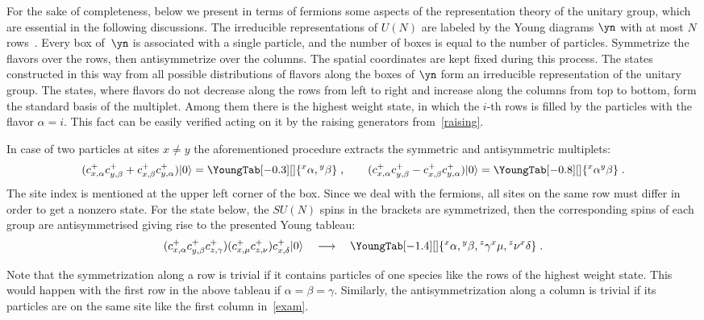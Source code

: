 For the sake of completeness,  below we present in terms of fermions  some aspects
of the representation theory  of the unitary group, which are essential in
the following discussions.
The irreducible representations of $U(N)$
are labeled by the Young diagrams $\yn$ with at most $N$ rows~\cite{Hamermesh}.
Every box of~$\yn$ is associated with a single particle,
and the number of boxes is equal to  the number of particles.
Symmetrize the f\/lavors over the rows, then antisymmetrize over the columns. The spatial coordinates
are kept f\/ixed during this process.
The states constructed in this way from all possible distributions of  f\/lavors along the
boxes of $\yn$  form an irreducible representation of the unitary group.
The states, where f\/lavors do not decrease along the rows from left to right
and increase along the columns from top to bottom, form the standard basis of the multiplet.
Among them there is the highest weight state, in which the $i$-th rows is f\/illed
by the particles with the f\/lavor $\alpha=i$. This fact can be easily verif\/ied acting
on it by the raising generators from~\eqref{raising}.

In case of two particles at sites $x\ne y$ the aforementioned procedure
extracts the symmetric and antisymmetric multiplets:
%
\def\YGbox{15}    %
\def\YGrule{0.4}   %
\[
(c^+_{x,\alpha}c^+_{y,\beta}+c^+_{x,\beta}c^+_{y,\alpha})|0\rangle
=
\YoungTab[-0.3][\normalsize]{ {{}^x\alpha,{}^y\beta} }
\;,
\qquad
(c^+_{x,\alpha}c^+_{y,\beta}-c^+_{x,\beta}c^+_{y,\alpha})|0\rangle
=
\YoungTab[-0.8][\normalsize]{ {{}^x\alpha}{{}^y\beta} }\;.
\]
The site index is mentioned at the upper left corner of the box.
Since we deal with the fermions, all sites on the same row must dif\/fer in order to
get a nonzero state.
For the state below, the $SU(N)$ spins in the brackets are symmetrized, then the corresponding spins
of each group are antisymmetrised giving rise to the presented Young tableau:
\begin{equation}
\label{exam}
(c^+_{x,\alpha}c^+_{y,\beta}c^+_{z,\gamma})(c^+_{x,\mu}c^+_{z,\nu})c^+_{x,\delta}|0\rangle
\quad\longrightarrow\quad
\YoungTab[-1.4][\normalsize]{ {{}^x\alpha,{}^y\beta,{}^z\gamma} {{}^x\mu,{}^z\nu } {{}^x\delta }}\;.
\end{equation}

Note that the symmetrization along a row is trivial if it contains particles of one species
like the rows of the highest weight state.
This would happen with the f\/irst row in the above tableau if $\alpha=\beta=\gamma$.
Similarly, the antisymmetrization along a column is trivial if its particles are on the same site like
the f\/irst column in~\eqref{exam}.

